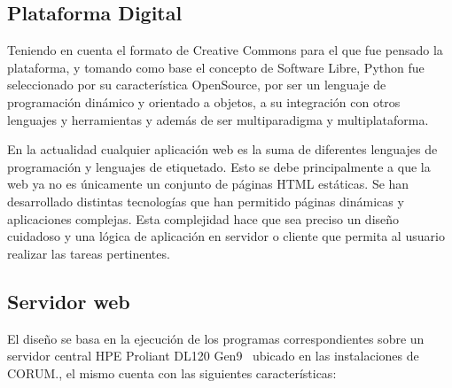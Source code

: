 \documentclass[journal,transmag]{IEEEtran}
\begin{document}
\subsection{Plataforma Digital}
Teniendo en cuenta el formato de Creative Commons para el que fue pensado la plataforma, y tomando como base el concepto de Software Libre, Python fue seleccionado por su característica OpenSource, por ser un lenguaje de programación dinámico y orientado a objetos, a su integración con otros lenguajes y herramientas y además de ser multiparadigma y multiplataforma.

En la actualidad cualquier aplicación web es la suma de diferentes lenguajes de programación y lenguajes de etiquetado. Esto se debe principalmente a que la web ya no es únicamente un conjunto de páginas HTML estáticas. Se han desarrollado distintas tecnologías que han permitido páginas dinámicas y aplicaciones complejas. Esta complejidad hace que sea preciso un diseño cuidadoso y una lógica de aplicación en servidor o cliente que permita al usuario realizar las tareas pertinentes.

\subsection{Servidor web}
El diseño se basa en la ejecución de los programas correspondientes sobre un servidor central HPE Proliant DL120 Gen9~\cite{Manual2018} ubicado en las instalaciones de CORUM., el mismo cuenta con las siguientes características: 
\end{document}
